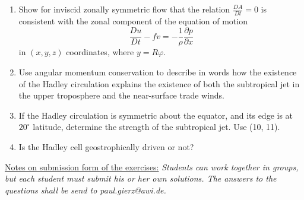 \documentclass[a4paper,12pt]{article}
\begin{document}
\begin{enumerate}
\begin{enumerate}

\item Show for inviscid zonally symmetric flow that the relation
  $\frac{DA}{Dt}=0$ is consistent with the zonal component of the equation of motion 
 \begin{equation}
      \frac{Du}{Dt} - f v = -\frac{1}{\rho}\frac{\partial p}{\partial x}
      \label{udyn}
\end{equation}
in $\left(x,y,z\right)$ coordinates, where $y=R\varphi$.

\item Use angular momentum conservation to describe in words how the
  existence of the Hadley circulation explains the existence of both
  the subtropical jet in the upper troposphere and the near-surface trade winds.

\item If the Hadley circulation is symmetric about the equator, and
  its edge is at $20^{\circ}$ latitude, determine the strength of the subtropical jet. Use (10, 11).

\item Is the Hadley cell geostrophically driven or not?
\end{enumerate}

\end{enumerate}


\vfill
\underline{Notes on submission form of the exercises:}
 \textit{Students can work together in groups, but each student must
   submit his or her own solutions. The answers to the questions shall be send to paul.gierz@awi.de.}
\end{document}

